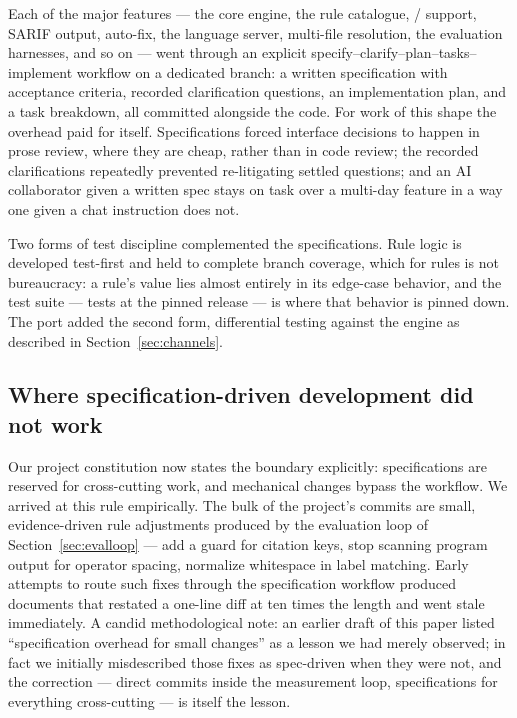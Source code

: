 \documentclass[nojss,article]{jss}
\begin{document}
Each of the \StatSpecCount{} major features --- the core engine, the
rule catalogue, / support, SARIF output,
auto-fix, the language server, multi-file resolution, the evaluation
harnesses, and so on --- went through an explicit
specify--clarify--plan--tasks--implement workflow on a dedicated
branch: a written specification with acceptance criteria, recorded
clarification questions, an implementation plan, and a task breakdown,
all committed alongside the code. For work of this shape the overhead
paid for itself. Specifications forced interface decisions to happen
in prose review, where they are cheap, rather than in code review;
the recorded clarifications repeatedly prevented re-litigating settled
questions; and an AI collaborator given a written spec stays on task
over a multi-day feature in a way one given a chat instruction does
not.

Two forms of test discipline complemented the specifications.
Rule logic is developed test-first and held to complete branch
coverage, which for rules is not bureaucracy: a rule's value lies
almost entirely in its edge-case behavior, and the test suite ---
\StatTestCount{} tests at the pinned release --- is where that
behavior is pinned down. The  port added the second
form, differential testing against the  engine as
described in Section~\ref{sec:channels}.

\subsection{Where specification-driven development did not work}
\label{sec:specfail}

Our project constitution now states the boundary explicitly:
specifications are reserved for cross-cutting work, and mechanical
changes bypass the workflow. We arrived at this rule empirically. The
bulk of the project's commits are small, evidence-driven rule
adjustments produced by the evaluation loop of
Section~\ref{sec:evalloop} --- add a guard for citation keys, stop
scanning program output for operator spacing, normalize whitespace in
label matching. Early attempts to route such fixes through the
specification workflow produced documents that restated a one-line
diff at ten times the length and went stale immediately. A candid
methodological note: an earlier draft of this paper listed
``specification overhead for small changes'' as a lesson we had
merely observed; in fact we initially misdescribed those fixes as
spec-driven when they were not, and the correction --- direct commits
inside the measurement loop, specifications for everything
cross-cutting --- is itself the lesson.
\end{document}

